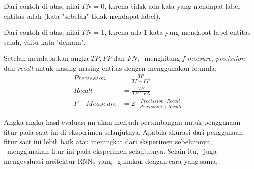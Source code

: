 \begin{enumerate}

	Dari contoh di atas, nilai $ FN = 0 $, karena tidak ada kata yang mendapat label entitas salah (kata "sebelah" tidak mendapat label).
	

	Dari contoh di atas, nilai $ FN = 1 $, karena ada 1 kata yang mendapat label entitas salah, yaitu kata "demam".
	
\end{enumerate}
	
Setelah mendapatkan angka $ TP, FP $ dan $ FN $, \saya~menghitung \textit{f-measure}, \textit{precission} dan \textit{recall} untuk masing-masing entitas dengan menggunakan formula:
\begin{align}
	Precission &= \frac{TP}{TP+FP}\\
	Recall &= \frac{TP}{TP+FN}\\
	F-Measeure &= 2 \cdot \frac{Precission \cdot Recall}{Precission + Recall}
\end{align}

Angka-angka hasil evaluasi ini akan menjadi pertimbangan untuk penggunaan fitur pada saat ini di eksperimen selanjutnya. Apabila akurasi dari penggunaan fitur saat ini lebih baik atau meningkat dari eksperimen sebelumnya, \saya~menggunakan fitur ini pada eksperimen selanjutnya. Selain itu, \saya~juga mengevaluasi arsitektur RNNs yang \saya~gunakan dengan cara yang sama.
	